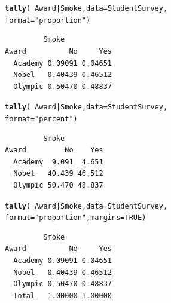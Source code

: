 \documentclass[10pt]{report}\usepackage[]{graphicx}\usepackage[]{xcolor}
\makeatletter
\newcommand{\hlnum}[1]{\textcolor[rgb]{0.686,0.059,0.569}{#1}}%
\newcommand{\hlsng}[1]{\textcolor[rgb]{0.192,0.494,0.8}{#1}}%
\newcommand{\hlopt}[1]{\textcolor[rgb]{0,0,0}{#1}}%
\newcommand{\hldef}[1]{\textcolor[rgb]{0.345,0.345,0.345}{#1}}%
\newcommand{\hlkwc}[1]{\textcolor[rgb]{0.333,0.667,0.333}{#1}}%
\newcommand{\hlkwd}[1]{\textcolor[rgb]{0.737,0.353,0.396}{\textbf{#1}}}%
\newenvironment{kframe}{%
 \def\at@end@of@kframe{}%
 \ifinner\ifhmode%
  \def\at@end@of@kframe{\end{minipage}}%
  \begin{minipage}{\columnwidth}%
 \fi\fi%
 \def\FrameCommand##1{\hskip\@totalleftmargin \hskip-\fboxsep
 \colorbox{shadecolor}{##1}\hskip-\fboxsep
     \hskip-\linewidth \hskip-\@totalleftmargin \hskip\columnwidth}%
 \MakeFramed {\advance\hsize-\width
   \@totalleftmargin\z@ \linewidth\hsize
   \@setminipage}}%
 {\par\unskip\endMakeFramed%
 \at@end@of@kframe}
\newenvironment{knitrout}{}{} %
\makeatother
\begin{document}
\begin{multicols}{3}
\begin{knitrout}\small
{}\color{fgcolor}\begin{kframe}
\begin{alltt}
\hlkwd{tally}\hldef{(}\hlopt{~} \hldef{Award} \hlopt{|} \hldef{Smoke ,} \hlkwc{data}\hldef{=StudentSurvey,}
      \hlkwc{format} \hldef{=} \hlsng{"proportion"}\hldef{)}
\end{alltt}
\begin{verbatim}
         Smoke
Award          No     Yes
  Academy 0.09091 0.04651
  Nobel   0.40439 0.46512
  Olympic 0.50470 0.48837
\end{verbatim}
\end{kframe}
\end{knitrout}
\vspace*{-.20in}
\begin{knitrout}\small
{}\color{fgcolor}\begin{kframe}
\begin{alltt}
\hlkwd{tally}\hldef{(}\hlopt{~} \hldef{Award} \hlopt{|} \hldef{Smoke ,} \hlkwc{data}\hldef{=StudentSurvey,}
      \hlkwc{format} \hldef{=} \hlsng{"percent"}\hldef{)}
\end{alltt}
\begin{verbatim}
         Smoke
Award         No    Yes
  Academy  9.091  4.651
  Nobel   40.439 46.512
  Olympic 50.470 48.837
\end{verbatim}
\end{kframe}
\end{knitrout}
\vspace*{-.20in}

\begin{knitrout}\small
{}\color{fgcolor}\begin{kframe}
\begin{alltt}
\hlkwd{tally}\hldef{(}\hlopt{~} \hldef{Award} \hlopt{|} \hldef{Smoke,} \hlkwc{data}\hldef{=StudentSurvey,}
      \hlkwc{format} \hldef{=} \hlsng{"proportion"}\hldef{,} \hlkwc{margins} \hldef{=} \hlnum{TRUE}\hldef{)}
\end{alltt}
\begin{verbatim}
         Smoke
Award          No     Yes
  Academy 0.09091 0.04651
  Nobel   0.40439 0.46512
  Olympic 0.50470 0.48837
  Total   1.00000 1.00000
\end{verbatim}
\end{kframe}
\end{knitrout}

\end{multicols}
\end{document}
